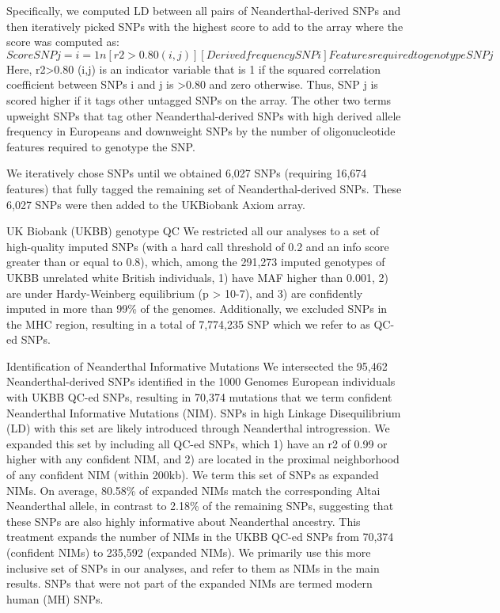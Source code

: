 Specifically, we computed LD between all pairs of Neanderthal-derived SNPs and then iteratively picked SNPs with the highest score to add to the array where the score was computed as:
$$ScoreSNP j = i=1n [r2>0.80 (i,j) ][Derived frequencySNP i ]Features required to genotype SNP j$$
Here, r2>0.80 (i,j) is an indicator variable that is 1 if the squared correlation coefficient between SNPs i and j is >0.80 and zero otherwise. Thus, SNP j is scored higher if it tags other untagged SNPs on the array. The other two terms upweight SNPs that tag other Neanderthal-derived SNPs with high derived allele frequency in Europeans and downweight SNPs by the number of oligonucleotide features required to genotype the SNP.

We iteratively chose SNPs until we obtained 6,027 SNPs (requiring 16,674 features) that fully tagged the remaining set of Neanderthal-derived SNPs. These 6,027 SNPs were then added to the UKBiobank Axiom array.

UK Biobank (UKBB) genotype QC 
We restricted all our analyses to a set of high-quality imputed SNPs (with a hard call threshold of 0.2 and an info score greater than or equal to 0.8), which, among the 291,273 imputed genotypes of UKBB unrelated white British individuals, 1) have MAF higher than 0.001, 2) are under Hardy-Weinberg equilibrium (p > 10-7), and 3) are confidently imputed in more than 99\% of the genomes. Additionally, we excluded SNPs in the MHC region, resulting in a total of 7,774,235 SNP which we refer to as QC-ed SNPs. 

Identification of Neanderthal Informative Mutations
We intersected the 95,462 Neanderthal-derived SNPs identified in the 1000 Genomes European individuals with UKBB QC-ed SNPs, resulting in 70,374 mutations that we term confident Neanderthal Informative Mutations (NIM). SNPs in high Linkage Disequilibrium (LD) with this set are likely introduced through Neanderthal introgression. We expanded this set by including all QC-ed SNPs, which 1) have an r2 of 0.99 or higher with any confident NIM, and 2) are located in the proximal neighborhood of any confident NIM (within 200kb). We term this set of SNPs as expanded NIMs. On average, 80.58\% of expanded NIMs match the corresponding Altai Neanderthal allele, in contrast to 2.18\% of the remaining SNPs, suggesting that these SNPs are also highly informative about Neanderthal ancestry. This treatment expands the number of NIMs in the UKBB QC-ed SNPs from 70,374 (confident NIMs) to 235,592 (expanded NIMs). We primarily use this more inclusive set of SNPs in our analyses, and refer to them as NIMs in the main results. SNPs that were not part of the expanded NIMs are termed modern human (MH) SNPs.

